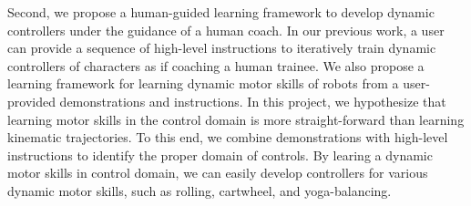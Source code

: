 \begin{summary}
  Second, we propose a human-guided learning framework to develop dynamic
  controllers under the guidance of a human coach.
  In our previous work, a user can provide a sequence of high-level instructions
  to iteratively train dynamic controllers of characters 
  as if coaching a human trainee.
  We also propose a learning framework for learning dynamic motor skills
  of robots from a user-provided demonstrations and instructions.
  In this project, we hypothesize that learning motor skills in the control domain
  is more straight-forward than learning kinematic trajectories.
  To this end, we combine demonstrations with high-level instructions
  to identify the proper domain of controls.
  By learing a dynamic motor skills in control domain, we can easily develop
  controllers for various dynamic motor skills, such as rolling,
  cartwheel, and yoga-balancing.



\end{summary}
